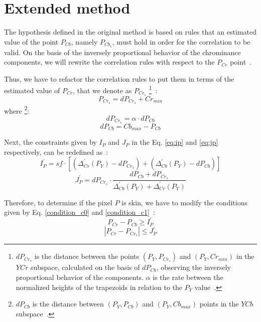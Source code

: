 \section{Extended method}
\label{sec:proposed_method}
The hypothesis defined in the original method is based on rules that an estimated value of the point $P_{Cb}$, namely $P_{Cb_s}$, must hold in order for the correlation to be valid. On the basis of the inversely proportional behavior of the chrominance components, we will rewrite the correlation rules with respect to the $P_{Cr}$ point~\citep{faria:18}.

Thus, we have to refactor the correlation rules to put them in terms of the estimated value of $P_{Cr}$, that we denote as $P_{Cr_s}$ \footnote{$dP_{Cr_s}$ is the distance between the points $(P_Y, P_{Cr_s})$ and $(P_Y, Cr_{min})$ in the $YCr$ subspace, calculated on the basis of $dP_{Cb}$, observing the inversely proportional behavior of the components. $\alpha$ is the rate between the normalized heights of the trapezoids in relation to the $P_Y$ value~\citep{faria:18}.}~\citep{faria:18}:
\begin{equation}
    P_{Cr_s} = dP_{Cr_s} + Cr_{min}
\end{equation}
where \footnote{$dP_{Cb}$ is the distance between $(P_Y, P_{Cb})$ and $(P_Y, Cb_{max})$ points in the $YCb$ subspace~\citep{faria:18}.}:
\begin{equation}
    dP_{Cr_s} = \alpha \cdot dP_{Cb}
\end{equation}
\begin{equation}
    dP_{Cb}   = Cb_{max} - P_{Cb}
\end{equation}

Next, the constraints given by $I_P$ and $J_P$ in the Eq. \ref{eq:ip} and \ref{eq:jp} respectively, can be redefined as~\citep{faria:18}:
\begin{equation}
    I^{'}_P = sf \cdot [(\Delta^{'}_{Cr}(P_Y) - dP_{Cr_s}) + (\Delta^{'}_{Cb}(P_Y) - dP_{Cb})]
\end{equation}
\begin{equation}
    J^{'}_P = dP_{Cr_s} \cdot \frac{dP_{Cb} + dP_{Cr_s}} {\Delta^{'}_{Cb}(P_Y) + \Delta^{'}_{Cr}(P_Y)}
\end{equation}

Therefore, to determine if the pixel $P$ is skin, we have to modify the conditions given by Eq. \ref{condition_c0} and \ref{condition_c1}~\citep{faria:18}:
\begin{equation}
    P_{Cr} - P_{Cb} \geq I^{'}_P
\label{condition_c00}
\end{equation}
\begin{equation}
   |P_{Cr} - P_{Cr_s}| \leq J^{'}_P
\label{condition_c11}
\end{equation}


